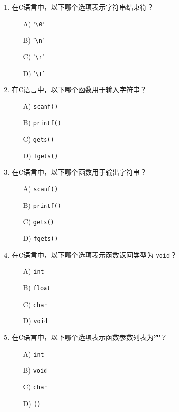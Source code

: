 \documentclass[a4paper,12pt]{article}
\begin{document}
\begin{enumerate}
	\item 在C语言中，以下哪个选项表示字符串结束符？
	      \begin{enumerate}
		      \item[A)] '\texttt{\textbackslash0}'
		      \item[B)] '\texttt{\textbackslash n}'
		      \item[C)] '\texttt{\textbackslash r}'
		      \item[D)] '\texttt{\textbackslash t}'
	      \end{enumerate}
	      \vspace{0.3cm}

	\item 在C语言中，以下哪个函数用于输入字符串？
	      \begin{enumerate}
		      \item[A)] \texttt{scanf()}
		      \item[B)] \texttt{printf()}
		      \item[C)] \texttt{gets()}
		      \item[D)] \texttt{fgets()}
	      \end{enumerate}
	      \vspace{0.3cm}

	\item 在C语言中，以下哪个函数用于输出字符串？
	      \begin{enumerate}
		      \item[A)] \texttt{scanf()}
		      \item[B)] \texttt{printf()}
		      \item[C)] \texttt{gets()}
		      \item[D)] \texttt{fgets()}
	      \end{enumerate}
	      \vspace{0.3cm}

	\item 在C语言中，以下哪个选项表示函数返回类型为 \texttt{void}？
	      \begin{enumerate}
		      \item[A)] \texttt{int}
		      \item[B)] \texttt{float}
		      \item[C)] \texttt{char}
		      \item[D)] \texttt{void}
	      \end{enumerate}
	      \vspace{0.3cm}

	\item 在C语言中，以下哪个选项表示函数参数列表为空？
	      \begin{enumerate}
		      \item[A)] \texttt{int}
		      \item[B)] \texttt{void}
		      \item[C)] \texttt{char}
		      \item[D)] \texttt{()}
	      \end{enumerate}
	      \vspace{0.3cm}


\end{enumerate}
\end{document}

